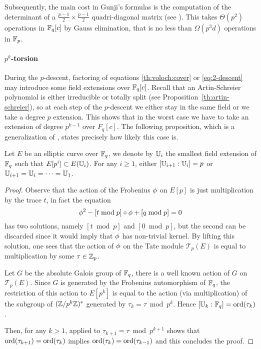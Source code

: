 Subsequently, the main cost in Gunji's formulas is the computation of
the determinant of a $\frac{p-1}{2}\times\frac{p-1}{2}$
quadri-diagonal matrix (see \cite{gunji76}). This takes $\Theta(p^2)$
operations in $\mathbb{F}_q[c]$ by Gauss elimination, that is no less than
$\Omega(p^3d)$ operations in $\mathbb{F}_p$.

\paragraph{$p^k$-torsion}
During the $p$-descent, factoring of equations \eqref{th:voloch:cover}
or \eqref{eq:2-descent} may introduce some field extensions over
$\mathbb{F}_q[c]$. Recall that an Artin-Schreier polynomial is either
irreducible or totally split (see
Proposition~\ref{th:artin-schreier}), so at each step of the
$p$-descent we either stay in the same field or we take a degree $p$
extension. This shows that in the worst case we have to take an
extension of degree $p^{k-1}$ over $F_q[c]$. The following
proposition, which is a generalization of
\cite[Prop. 26]{lercier-algorithmique}, states precisely how likely
this case is.

\begin{proposition}
  \label{th:tower}
  Let $E$ be an elliptic curve over $\mathbb{F}_q$, we denote by $\mathbb{U}_i$ the
  smallest field extension of $\mathbb{F}_q$ such that $E[p^i]\subset
  E(\mathbb{U}_i)$. For any $i\ge1$, either $[\mathbb{U}_{i+1}:\mathbb{U}_i] = p$ or
  $\mathbb{U}_{i+1}=\mathbb{U}_i=\cdots=\mathbb{U}_1$.
\end{proposition}
\begin{proof}
  Observe that the action of the Frobenius $\phi$ on $E[p]$ is
  just multiplication by the trace $t$, in fact the equation
  \[\phi^2 - [t \bmod p]\circ\phi + [q \bmod p] = 0\]
  has two solutions, namely $[t \bmod p]$ and $[0 \bmod p]$, but the
  second can be discarded since it would imply that $\phi$ has
  non-trivial kernel.  By lifting this solution, one sees that the
  action of $\phi$ on the Tate module $\mathcal{T}_p(E)$ is equal
  to multiplication by some $\tau\in\mathbb{Z}_p$.

  Let $G$ be the absolute Galois group of $\mathbb{F}_q$, there is a well
  known action of $G$ on $\mathcal{T}_p(E)$. Since $G$ is generated by
  the Frobenius automorphism of $\mathbb{F}_q$, the restriction of this action
  to $E[p^k]$ is equal to the action (via multiplication) of the
  subgroup of $(\mathbb{Z}/p^k\mathbb{Z})^\ast$ generated by $\tau_k = \tau \bmod
  p^k$. Hence $[\mathbb{U}_k:\mathbb{F}_q] = \operatorname{ord}(\tau_k)$.

  Then, for any $k>1$, \cite[Corollary 4]{lercier-algorithmique}
  applied to $\tau_{k+1}=\tau\bmod p^{k+1}$ shows that
  $\operatorname{ord}(\tau_{k+1})=\operatorname{ord}(\tau_k)$ implies
  $\operatorname{ord}(\tau_k)=\operatorname{ord}(\tau_{k-1})$ and this concludes the proof.
\end{proof}

